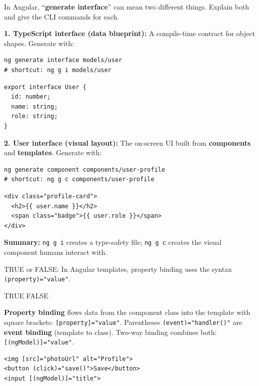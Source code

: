 \newpage



\question[6]
In Angular, ``\textbf{generate interface}'' can mean two different things. Explain both and give the CLI commands for each.
\begin{solutionorbox}[4.5in]
\textbf{1. TypeScript interface (data blueprint):} A compile-time contract for object shapes. Generate with:
\begin{lstlisting}[style=bash]
ng generate interface models/user
# shortcut: ng g i models/user
\end{lstlisting}
\begin{lstlisting}[style=ts]
export interface User {
  id: number;
  name: string;
  role: string;
}
\end{lstlisting}

\textbf{2. User interface (visual layout):} The on-screen UI built from \textbf{components} and \textbf{templates}. Generate with:
\begin{lstlisting}[style=bash]
ng generate component components/user-profile
# shortcut: ng g c components/user-profile
\end{lstlisting}
\begin{lstlisting}[style=htmlinline]
<div class="profile-card">
  <h2>{{ user.name }}</h2>
  <span class="badge">{{ user.role }}</span>
</div>
\end{lstlisting}

\textbf{Summary:} \lstinline[style=bashinline]|ng g i| creates a type-safety file; \lstinline[style=bashinline]|ng g c| creates the visual component humans interact with.
\end{solutionorbox}

\question[4]
TRUE or FALSE: In Angular templates, property binding uses the syntax \lstinline[style=htmlinline]|(property)="value"|.
\begin{choices}
  \choice TRUE
  \CorrectChoice FALSE
\end{choices}
\begin{solution}
  \textbf{Property binding} flows data from the component class into the template with square brackets: \lstinline[style=htmlinline]|[property]="value"|. Parentheses \lstinline[style=htmlinline]|(event)="handler()"| are \textbf{event binding} (template to class). Two-way binding combines both: \lstinline[style=htmlinline]|[(ngModel)]="value"|.
\begin{lstlisting}[style=htmlinline]
<img [src]="photoUrl" alt="Profile">
<button (click)="save()">Save</button>
<input [(ngModel)]="title">
\end{lstlisting}
\end{solution}



